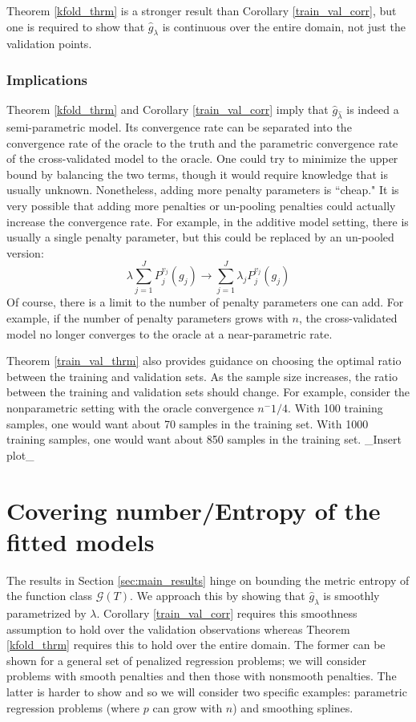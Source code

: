 \documentclass[12pt]{article}
\begin{document}
Theorem \ref{kfold_thrm} is a stronger result than Corollary \ref{train_val_corr}, but one is required to show that $\hat{g}_\lambda$ is continuous over the entire domain, not just the validation points.

\subsubsection{Implications}

Theorem \ref{kfold_thrm} and Corollary \ref{train_val_corr} imply that $\hat{g}_{\hat{\lambda}}$ is indeed a semi-parametric model. Its convergence rate can be separated into the convergence rate of the oracle to the truth and the parametric convergence rate of the cross-validated model to the oracle. One could try to minimize the upper bound by balancing the two terms, though it would require knowledge that is usually unknown. Nonetheless, adding more penalty parameters is ``cheap." It is very possible that adding more penalties or un-pooling penalties could actually increase the convergence rate. For example, in the additive model setting, there is usually a single penalty parameter, but this could be replaced by an un-pooled version:
\begin{equation}
\lambda \sum_{j=1}^J P_j^{v_j}(g_j) \rightarrow  \sum_{j=1}^J \lambda_j P_j^{v_j}(g_j)
\end{equation}
Of course, there is a limit to the number of penalty parameters one can add. For example, if the number of penalty parameters grows with $n$, the cross-validated model no longer converges to the oracle at a near-parametric rate.

Theorem \ref{train_val_thrm} also provides guidance on choosing the optimal ratio between the training and validation sets. As the sample size increases, the ratio between the training and validation sets should change. For example, consider the nonparametric setting with the oracle convergence $n^-1/4$. With 100 training samples, one would want about 70 samples in the training set. With 1000 training samples, one would want about 850 samples in the training set. \_Insert plot\_

\section{Covering number/Entropy of the fitted models}

The results in Section \ref{sec:main_results} hinge on bounding the metric entropy of the function class $\mathcal{G}(T)$. We approach this by showing that $\hat{g}_\lambda$ is smoothly parametrized by $\lambda$. 
Corollary \ref{train_val_corr} requires this smoothness assumption to hold over the validation observations whereas Theorem \ref{kfold_thrm} requires this to hold over the entire domain. The former can be shown for a general set of penalized regression problems; we will consider problems with smooth penalties and then those with nonsmooth penalties. The latter is harder to show and so we will consider two specific examples: parametric regression problems (where $p$ can grow with $n$) and smoothing splines.
\end{document}
